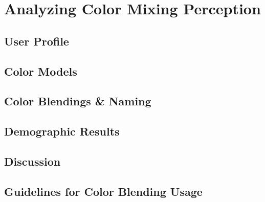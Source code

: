 
\section{Analyzing Color Mixing Perception}
\label{sec:results}

\subsection{User Profile}

\subsection{Color Models}

\subsection{Color Blendings \& Naming}

\subsection{Demographic Results}

\subsection{Discussion}

\subsection{Guidelines for Color Blending Usage}

